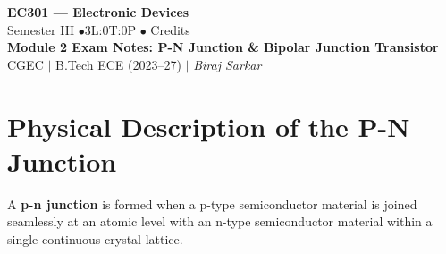 \documentclass[12pt,a4paper]{article}
\begin{document}

\begin{center}
  {\LARGE\bfseries\color{myred} EC301 --- Electronic Devices}\\[5pt]
  {\normalsize\color{mydark} Semester III \quad$\bullet$\quad 3L:0T:0P \quad$\bullet$ Credits}\\[3pt]
  {\normalsize\color{myteal}\textbf{Module 2 Exam Notes: P-N Junction \& Bipolar Junction Transistor}}\\[3pt]
  {\small\color{mydark} CGEC \;$|$\; B.Tech ECE (2023--27) \;$|$\; \textit{Biraj Sarkar}}
\end{center}
\vspace{2pt}
\noindent{\color{myred}\rule{\linewidth}{1.5pt}}
\vspace{2pt}

\hypersetup{linkcolor=mydark}
\tableofcontents
\hypersetup{linkcolor=myteal}
\newpage

\section{Physical Description of the P-N Junction}

A \textbf{p-n junction} is formed when a p-type semiconductor material is joined seamlessly at an atomic level with an n-type semiconductor material within a single continuous crystal lattice.
\end{document}
